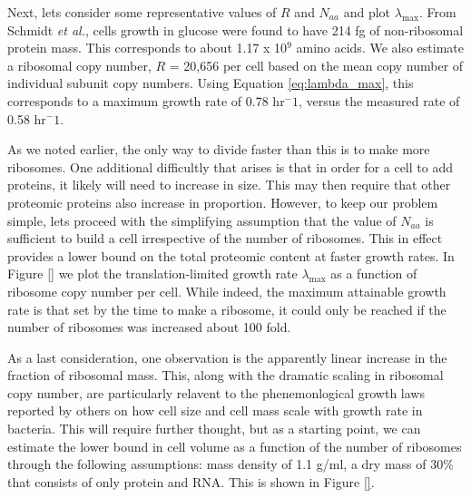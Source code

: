 \documentclass[11pt, letterpaper]{article}
\begin{document}
%
%
%
%
%


Next, lets consider some representative values of $R$ and $N_{aa}$ and plot
$\lambda_{\text{max}}$. From Schmidt {\it et al.}, cells growth in glucose were
found to have 214 fg of non-ribosomal  protein mass. This corresponds to about
1.17 x 10$^9$ amino acids. We also estimate a  ribosomal copy number, $R$ =
20,656 per cell based on the mean copy number of individual subunit copy
numbers. Using Equation \ref{eq:lambda_max}, this corresponds to a maximum
growth rate of 0.78 hr$^-1$, versus the measured rate of 0.58 hr$^-1$.

As we noted earlier, the only way to divide faster than this is to make more
ribosomes. One additional difficultly that arises is that in order for a cell to
add proteins, it likely will need to increase in size. This may then require
that other proteomic proteins also increase in proportion. However, to keep our
problem simple, lets proceed with the simplifying assumption that the value of
$N_{aa}$ is sufficient to build a cell irrespective of the number of ribosomes.
This in effect provides a lower bound on the total proteomic content at faster
growth rates. In Figure \ref{} we plot the translation-limited growth rate
$\lambda_{\text{max}}$ as a function of ribosome copy number per cell. While indeed,
the maximum attainable growth rate is that set by the time to make a ribosome,
it could only be reached if the number of ribosomes was increased about 100 fold.

As a last consideration, one observation is the apparently linear
increase in the fraction of ribosomal mass. This, along with the dramatic
scaling in ribosomal copy number, are particularly relavent to the
phenemonlogical growth laws reported by others on how cell size and cell mass
scale with growth rate in bacteria.  This will require further thought, but as a
starting point, we can estimate the lower bound in cell volume as a function of
the number of ribosomes through the following assumptions:  mass density of 1.1
g/ml, a dry mass of 30\% that consists of only protein and RNA.  This is shown
in  Figure \ref{}.
\end{document}
